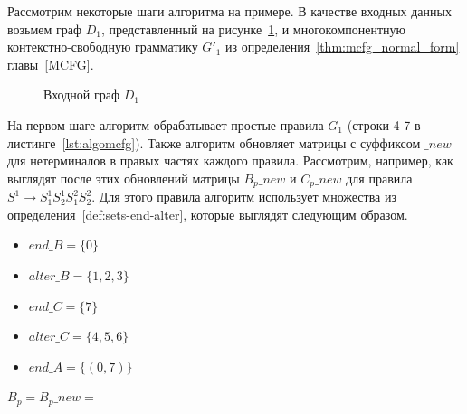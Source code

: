 Рассмотрим некоторые шаги алгоритма на примере. В качестве входных данных возьмем граф $D_1$, представленный на рисунке~\ref{fig:example_input_graph_mcfg}, и многокомпонентную контекстно-свободную грамматику $G'_1$ из определения~\ref{thm:mcfg_normal_form} главы~\ref{MCFG}.

\begin{figure}[h]
	\centering
	\caption{Входной граф $D_1$}
	\label{fig:example_input_graph_mcfg}
\end{figure}

На первом шаге алгоритм обрабатывает простые правила $G_1$ (строки 4-7 в листинге~\ref{lst:algomcfg}). Также алгоритм обновляет матрицы с суффиксом $\_new$ для нетерминалов в правых частях каждого правила. Рассмотрим, например, как выглядят после этих обновлений матрицы $B_p\_new$ и $C_p\_new$ для правила $S^1 \rightarrow S_1^1 S_2^1 S_1^2 S_2^2$. Для этого правила алгоритм использует множества из определения~\ref{def:sets-end-alter}, которые выглядят следующим образом.

\begin{center}
	\begin{itemize}
		\item $end\_B = \{0\}$
		\item $alter\_B = \{1,2,3\}$
		\item $end\_C = \{7\}$
		\item $alter\_C = \{4,5,6\}$
		\item $end\_A = \{(0, 7)\}$
	\end{itemize}
\end{center}

\begin{center}
	$B_p = B_p\_new = $ {\footnotesize
	}
\end{center}


